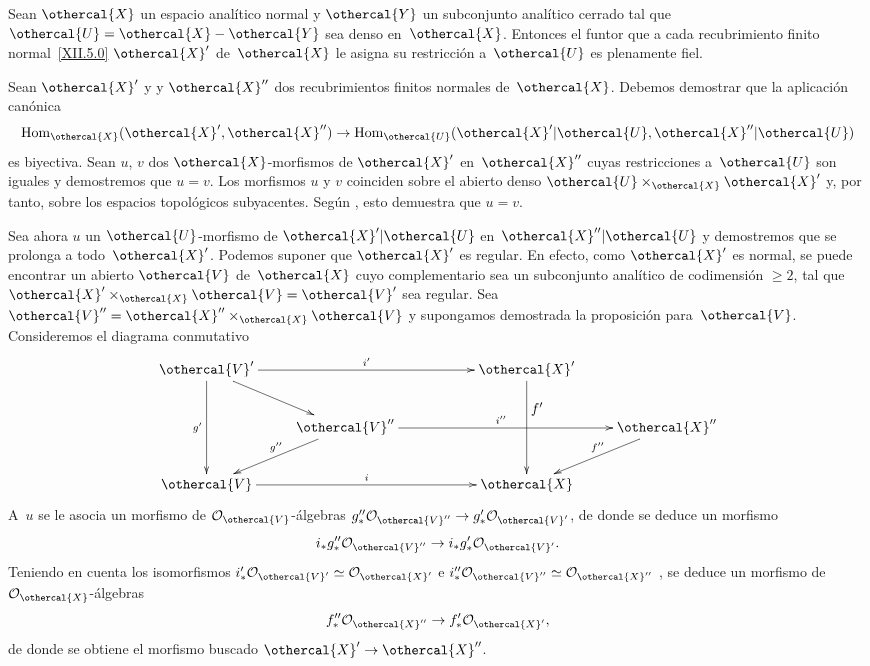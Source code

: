 
\begin{proposition}
\label{XII.5.3}
Sean $\othercal{X}$ un espacio analítico normal y $\othercal{Y}$ un
subconjunto analítico cerrado tal que
$\othercal{U}=\othercal{X}-\othercal{Y}$ sea denso en~$\othercal{X}$.
Entonces el funtor que a cada recubrimiento finito
normal~\eqref{XII.5.0} $\othercal{X}'$ de~$\othercal{X}$ le asigna su
restricción a~$\othercal{U}$ es plenamente fiel.
\end{proposition}

Sean $\othercal{X}'$
{y}
{y}%
$\othercal{X}''$ dos recubrimientos finitos normales de~$\othercal{X}$.
Debemos demostrar que la aplicación canónica
$$
\Hom_{\othercal{X}}(\othercal{X}',\othercal{X}'') \to
\Hom_{\othercal{U}}(\othercal{X}'|\othercal{U},\othercal{X}''|\othercal{U})
$$
es biyectiva. Sean $u$, $v$ dos $\othercal{X}$-morfismos de
$\othercal{X}'$ en~$\othercal{X}''$ cuyas restricciones a~$\othercal{U}$
son iguales y demostremos que $u=v$. Los morfismos $u$ y
$v$ coinciden sobre el abierto denso
$\othercal{U}\times_{\othercal{X}}\othercal{X}'$ y, por tanto, sobre los
espacios topológicos subyacentes. Según
\hbox{\cite[~\S 4~cor]{XII.4}}, esto demuestra que $u=v$.

Sea ahora $u$ un $\othercal{U}$-morfismo de
$\othercal{X}'|\othercal{U}$ en~$\othercal{X}''|\othercal{U}$ y
demostremos que se prolonga a todo~$\othercal{X}'$. Podemos suponer que
$\othercal{X}'$ es regular. En efecto, como $\othercal{X}'$ es normal,
se puede encontrar un abierto $\othercal{V}$ de~$\othercal{X}$ cuyo
complementario sea un subconjunto analítico de codimensión $\geq2$, tal
que $\othercal{X}'\times_{\othercal{X}}\othercal{V}=\othercal{V}'$ sea
regular. Sea
$\othercal{V}''=\othercal{X}''\times_{\othercal{X}}\othercal{V}$ y
supongamos demostrada la proposición para~$\othercal{V}$. Consideremos el
diagrama conmutativo
\begingroup
\shorthandoff{>}%
$$
\xymatrix{ \othercal{V}' \ar[dd]_{g'}\ar[rd]\ar[rrr]^{i'} && &\othercal{X}'
\ar[dd]^{\hbox{\raise10mm\hbox{$f'$}}} \cr &\othercal{V}'' \ar[ld]_{g''\mkern-10mu}\ar[rrr]^-{i''~~} & &
&\othercal{X}'' \ar[ld]_{f''\mkern-12mu} \cr \othercal{V} \ar[rrr]^{i} && &\othercal{X} \cr
}
$$
\endgroup
A~$u$ se le asocia un morfismo de
$\cal{O}_{\othercal{V}}$-álgebras
$g''_*\cal{O}_{\othercal{V}''}\to g'_*\cal{O}_{\othercal{V}'}$, de donde
se deduce un morfismo
$$
i_*g''_*\cal{O}_{\othercal{V}''}\to
i_*g'_*\cal{O}_{\othercal{V}'}\quoi.
$$
Teniendo en cuenta los isomorfismos
$i'_*\cal{O}_{\othercal{V}'}\simeq\cal{O}_{\othercal{X}'}$ e
$i''_*\cal{O}_{\othercal{V}''}\simeq\cal{O}_{\othercal{X}''}$
\cite[~prop]{XII.11}, se deduce un morfismo de
$\cal{O}_{\othercal{X}}$-álgebras
$$
f''_*\cal{O}_{\othercal{X}''}\to
f'_*\cal{O}_{\othercal{X}'}\quoi,
$$
de donde se obtiene el morfismo buscado
$\othercal{X}'\to\othercal{X}''$.


